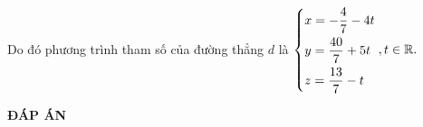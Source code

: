 \begin{ex}
{	Do đó phương trình tham số của đường thẳng $d$ là $\left\{\begin{aligned}&x=-\dfrac{4}{7} -4t \\ &y=\dfrac{40}{7} +5t \\ &z= \dfrac{13}{7} -t\end{aligned}\right. , t \in \mathbb{R}.$}
\end{ex}


\newpage
\begin{center}
	\textbf{ĐÁP ÁN}
\end{center}
\begin{multicols}{10}
	
\end{multicols}